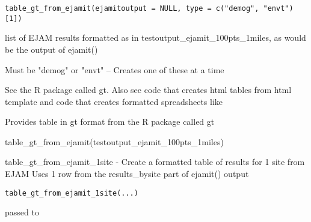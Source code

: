 \documentclass[a4paper]{book}
\begin{document}
%
\begin{Usage}
\begin{verbatim}
table_gt_from_ejamit(ejamitoutput = NULL, type = c("demog", "envt")[1])
\end{verbatim}
\end{Usage}
%
\begin{Arguments}
\begin{ldescription}
\item[\code{ejamitoutput}] list of EJAM results formatted as in testoutput\_ejamit\_100pts\_1miles,
as would be the output of ejamit()

\item[\code{type}] Must be "demog" or "envt" -- Creates one of these at a time
\end{ldescription}
\end{Arguments}
%
\begin{Details}\relax
See the R package called gt. Also see code that creates html tables from html template
and code that creates formatted spreadsheets like 
\end{Details}
%
\begin{Value}
Provides table in gt format from the R package called gt
\end{Value}
%
\begin{Examples}
\begin{ExampleCode}
 table_gt_from_ejamit(testoutput_ejamit_100pts_1miles)

\end{ExampleCode}
\end{Examples}
%
\begin{Description}\relax
table\_gt\_from\_ejamit\_1site - Create a formatted table of results for 1 site from EJAM
Uses 1 row from the results\_bysite part of ejamit() output
\end{Description}
%
\begin{Usage}
\begin{verbatim}
table_gt_from_ejamit_1site(...)
\end{verbatim}
\end{Usage}
%
\begin{Arguments}
\begin{ldescription}
\item[\code{...}] passed to 
\end{ldescription}
\end{Arguments}
\end{document}
